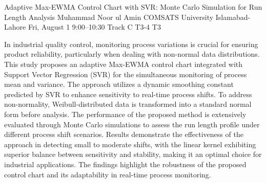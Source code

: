 \begin{talk}
  {Adaptive Max-EWMA Control Chart with SVR: Monte Carlo Simulation for Run Length Analysis}%
  {Muhammad Noor ul Amin}%
  {COMSATS University Islamabad-Lahore}%
  {}%
  {}%
  {}%
  {Fri, August 1 9:00–10:30 Track C}%
  {T3-4}%
  {T3}%
  {}%
  {}%
  {}%
				
			
In industrial quality control, monitoring process variations is crucial for ensuring product
reliability, particularly when dealing with non-normal data distributions. This study proposes an
adaptive Max-EWMA control chart integrated with Support Vector Regression (SVR) for the
simultaneous monitoring of process mean and variance. The approach utilizes a dynamic
smoothing constant predicted by SVR to enhance sensitivity to real-time process shifts. To
address non-normality, Weibull-distributed data is transformed into a standard normal form
before analysis. The performance of the proposed method is extensively evaluated through
Monte Carlo simulations to assess the run length profile under different process shift scenarios.
Results demonstrate the effectiveness of the approach in detecting small to moderate shifts, with
the linear kernel exhibiting superior balance between sensitivity and stability, making it an
optimal choice for industrial applications. The findings highlight the robustness of the proposed
control chart and its adaptability in real-time process monitoring.
\medskip

\end{talk}

